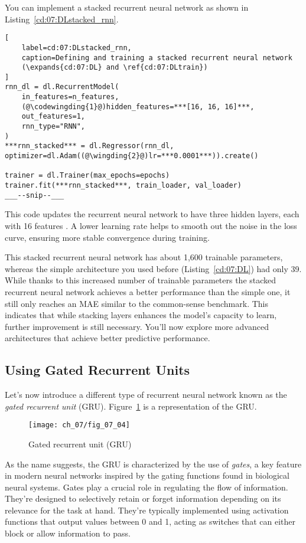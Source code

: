 You can implement a stacked recurrent neural network as shown in Listing~\ref{cd:07:DLstacked_rnn}.
\begin{lstlisting}[
    label=cd:07:DLstacked_rnn,
    caption=Defining and training a stacked recurrent neural network
    (\expands{cd:07:DL} and \ref{cd:07:DLtrain})
]
rnn_dl = dl.RecurrentModel(
    in_features=n_features,
    (@\codewingding{1}@)hidden_features=***[16, 16, 16]***,
    out_features=1,
    rnn_type="RNN",
)
***rnn_stacked*** = dl.Regressor(rnn_dl, optimizer=dl.Adam((@\wingding{2}@)lr=***0.0001***)).create()

trainer = dl.Trainer(max_epochs=epochs)
trainer.fit(***rnn_stacked***, train_loader, val_loader)
___--snip--___
\end{lstlisting}
This code updates the recurrent neural network to have three hidden layers, each with 16 features .
A lower learning rate  helps to smooth out the noise in the loss curve, ensuring more stable convergence during training.

This stacked recurrent neural network has about 1,600 trainable parameters, whereas the simple architecture you used before (Listing~\ref{cd:07:DL}) had only 39.
While thanks to this increased number of trainable parameters the stacked recurrent neural network achieves a better performance than the simple one, it still only reaches an MAE similar to the common-sense benchmark.
This indicates that while stacking layers enhances the model's capacity to learn, further improvement is still necessary. You'll now explore more advanced architectures that achieve better predictive performance.

\subsection{Using Gated Recurrent Units}

Let's now introduce a different type of recurrent neural network known as the \emph{gated recurrent unit} (GRU). 
Figure~\ref{fig:07:04} is a representation of the GRU.

\begin{figure}[H]
	\texttt{[image: ch\_07/fig\_07\_04]} 
	\caption{Gated recurrent unit (GRU)}
	\label{fig:07:04}
\end{figure}

As the name suggests, the GRU is characterized by the use of \emph{gates}, a key feature in modern neural networks inspired by the gating functions found in biological neural systems. 
Gates play a crucial role in regulating the flow of information. They're designed to selectively retain or forget information depending on its relevance for the task at hand. They're typically implemented using activation functions that output values between 0 and 1, acting as switches that can either block or allow information to pass.

